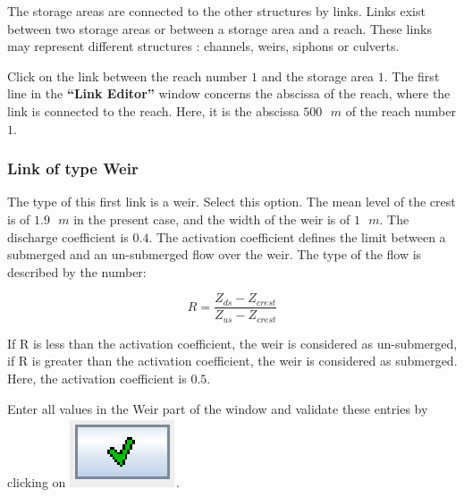 \documentclass[a4paper,12pt]{article}
\begin{document}
\hspace{0.5cm}The storage areas are connected to the other structures by links.
Links exist between two storage areas or between a storage area and
a reach. These links may represent different structures : channels,
weirs, siphons or culverts.

\vspace{0.5cm}

Click on the link between the reach number $1$ and the storage area
$1$. The first line in the \textbf{{}``Link Editor''} window concerns
the abscissa of the reach, where the link is connected to the reach.
Here, it is the abscissa $500\mbox{ }m$ of the reach number $1$. 


\subsubsection{Link of type Weir  }

\hspace{0.5cm}The type of this first link is a weir. Select this option. The mean
level of the crest is of $1.9\mbox{ }m$ in the present case, and the width of
the weir is of $1\mbox{ }m$. The discharge coefficient is $0.4$. The activation
coefficient defines the limit between a submerged and an un-submerged
flow over the weir. The type of the flow is described by the number: 

\vspace{0.5cm}

\begin{equation}
\nonumber
R=\frac{Z_{ds}-Z_{crest}}{Z_{us}-Z_{crest}} 
\end{equation}

\vspace{0.5cm}

If R is less than the activation coefficient, the weir is considered
as un-submerged, if R is greater than the activation coefficient,
the weir is considered as submerged. Here, the activation coefficient
is $0.5$. 

\vspace{0.5cm}

Enter all values in the Weir part of the window and validate these
entries by clicking on \includegraphics[scale=0.6]{valid}.
\end{document}
